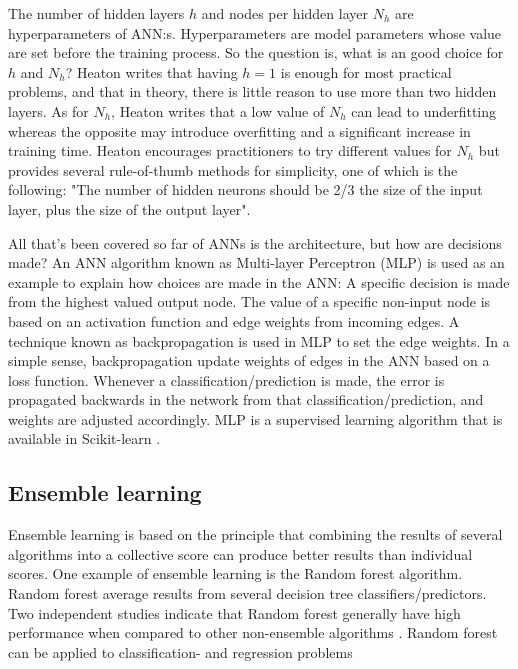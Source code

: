			The number of hidden layers $h$ and nodes per hidden layer $N_h$ are hyperparameters of ANN:s. Hyperparameters are model parameters whose value are set before the training process. So the question is, what is an good choice for $h$ and $N_h$? Heaton \cite{BOOK:10} writes that having $h=1$ is enough for most practical problems, and that in theory, there is little reason to use more than two hidden layers. As for $N_h$, Heaton writes that a low value of $N_h$ can lead to underfitting whereas the opposite may introduce overfitting and a significant increase in training time. Heaton encourages practitioners to try different values for $N_h$ but provides several rule-of-thumb methods for simplicity, one of which is the following: "The number of hidden neurons should be 2/3 the size of the input layer, plus the size of the output layer". %

			All that's been covered so far of ANNs is the architecture, but how are decisions made? An ANN algorithm known as Multi-layer Perceptron (MLP) is used as an example to explain how choices are made in the ANN: A specific decision is made from the highest valued output node. The value of a specific non-input node is based on an activation function and edge weights from incoming edges. 
A technique known as backpropagation is used in MLP to set the edge weights. In a simple sense, backpropagation update weights of edges in the ANN based on a loss function. Whenever a classification/prediction is made, the error is propagated backwards in the network from that classification/prediction, and weights are adjusted accordingly. MLP is a supervised learning algorithm that is available in Scikit-learn \cite{WEBSITE:32}.

	\subsection{Ensemble learning}
		Ensemble learning is based on the principle that combining the results of several algorithms into a collective score can produce better results than individual scores. One example of ensemble learning is the Random forest algorithm. Random forest average results from several decision tree classifiers/predictors. Two independent studies indicate that Random forest generally have high performance when compared to other non-ensemble algorithms \cite{ARTICLE:16, IP:5}. Random forest can be applied to classification- and regression problems \cite{WEBSITE:17}

